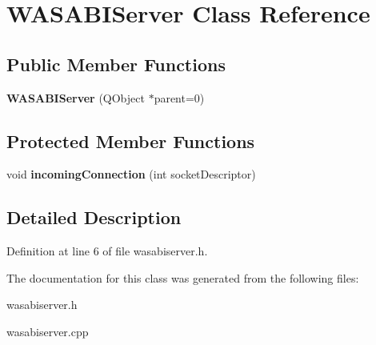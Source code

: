 \hypertarget{class_w_a_s_a_b_i_server}{
\section{\-W\-A\-S\-A\-B\-I\-Server \-Class \-Reference}
\label{class_w_a_s_a_b_i_server}
}
\subsection*{\-Public \-Member \-Functions}
\begin{DoxyCompactItemize}
\item 
\hypertarget{class_w_a_s_a_b_i_server_af3b390b1d38d6fe11f4ec82a599e6a31}{
{\bfseries \-W\-A\-S\-A\-B\-I\-Server} (\-Q\-Object $\ast$parent=0)}
\label{class_w_a_s_a_b_i_server_af3b390b1d38d6fe11f4ec82a599e6a31}

\end{DoxyCompactItemize}
\subsection*{\-Protected \-Member \-Functions}
\begin{DoxyCompactItemize}
\item 
\hypertarget{class_w_a_s_a_b_i_server_a3b32688ceb952eb8bd65d33c7dfa1f7a}{
void {\bfseries incoming\-Connection} (int socket\-Descriptor)}
\label{class_w_a_s_a_b_i_server_a3b32688ceb952eb8bd65d33c7dfa1f7a}

\end{DoxyCompactItemize}


\subsection{\-Detailed \-Description}


\-Definition at line 6 of file wasabiserver.\-h.



\-The documentation for this class was generated from the following files\-:\begin{DoxyCompactItemize}
\item 
wasabiserver.\-h\item 
wasabiserver.\-cpp\end{DoxyCompactItemize}
